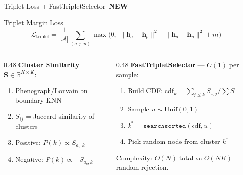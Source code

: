 \documentclass[aspectratio=169,10pt]{beamer}
\newcommand{\vect}[1]{\boldsymbol{#1}}
\newcommand{\mat}[1]{\mathbf{#1}}
\newcommand{\Lcal}{\mathcal{L}}
\newcommand{\Real}{\mathbb{R}}
\newcommand{\NEW}{\,{\scriptsize\colorbox{newgreen}{\color{white}\textbf{NEW}}}\,}
\begin{document}
\begin{frame}{Triplet Loss + FastTripletSelector \NEW}

\begin{block}{Triplet Margin Loss}
\vspace{-0.2cm}
\[
  \Lcal_{\text{triplet}} = \frac{1}{|\mathcal{A}|}\sum_{(a,p,n)} \max\!\big(0,\; \|\vect{h}_a - \vect{h}_p\|^2 - \|\vect{h}_a - \vect{h}_n\|^2 + m\big)
\]
\end{block}

\vspace{0.1cm}

\begin{columns}[T]
\begin{column}{0.48\textwidth}
\textbf{Cluster Similarity} $\mat{S} \in \Real^{K \times K}$:
{\small
\begin{enumerate}\setlength\itemsep{1pt}
  \item Phenograph/Louvain on boundary KNN
  \item $S_{ij}$ = Jaccard similarity of clusters
  \item Positive: $P(k) \propto S_{a_c, k}$
  \item Negative: $P(k) \propto -S_{a_c, k}$
\end{enumerate}
}
\end{column}
\begin{column}{0.48\textwidth}
\textbf{FastTripletSelector} --- $O(1)$ per sample:
{\small
\begin{enumerate}\setlength\itemsep{1pt}
  \item Build CDF: $\text{cdf}_k = \sum_{j \leq k} S_{a,j}/\sum S$
  \item Sample $u \sim \text{Unif}(0,1)$
  \item $k^* = \texttt{searchsorted}(\text{cdf}, u)$
  \item Pick random node from cluster $k^*$
\end{enumerate}
}

\vspace{0.1cm}
{\footnotesize Complexity: $O(N)$ total vs $O(NK)$ random rejection.}
\end{column}
\end{columns}
\end{frame}
\end{document}
